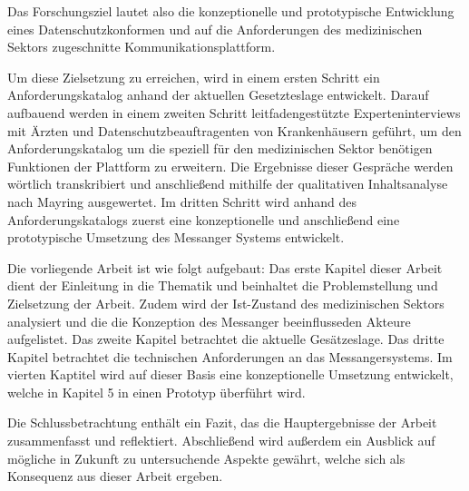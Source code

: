 Das Forschungsziel lautet also die konzeptionelle und prototypische Entwicklung eines Datenschutzkonformen und auf die Anforderungen des medizinischen Sektors zugeschnitte Kommunikationsplattform. 

Um diese Zielsetzung zu erreichen, wird in einem ersten Schritt ein Anforderungskatalog anhand der aktuellen Gesetzteslage entwickelt. Darauf aufbauend werden in einem zweiten Schritt leitfadengestützte Experteninterviews mit Ärzten und Datenschutzbeauftragenten von Krankenhäusern geführt, um den Anforderungskatalog um die speziell für den medizinischen Sektor benötigen Funktionen der Plattform zu erweitern. Die Ergebnisse dieser Gespräche werden wörtlich transkribiert und anschließend mithilfe der qualitativen Inhaltsanalyse nach Mayring ausgewertet. Im dritten Schritt wird anhand des Anforderungskatalogs zuerst eine konzeptionelle und anschließend eine prototypische Umsetzung des Messanger Systems entwickelt. 

Die vorliegende Arbeit ist wie folgt aufgebaut: Das erste Kapitel dieser Arbeit dient der Einleitung in die Thematik und beinhaltet die Problemstellung und Zielsetzung der Arbeit. Zudem wird der Ist-Zustand des medizinischen Sektors analysiert und die die Konzeption des Messanger beeinflusseden Akteure aufgelistet. Das zweite Kapitel betrachtet die aktuelle Gesätzeslage. Das dritte Kapitel betrachtet die technischen Anforderungen an das Messangersystems. Im vierten Kaptitel wird auf dieser Basis eine konzeptionelle Umsetzung entwickelt, welche in Kapitel 5 in einen Prototyp überführt wird.

Die Schlussbetrachtung enthält ein Fazit, das die Hauptergebnisse der Arbeit zusammenfasst und reflektiert. Abschließend wird außerdem ein Ausblick auf mögliche in Zukunft zu untersuchende Aspekte gewährt, welche sich als Konsequenz aus dieser Arbeit ergeben.
